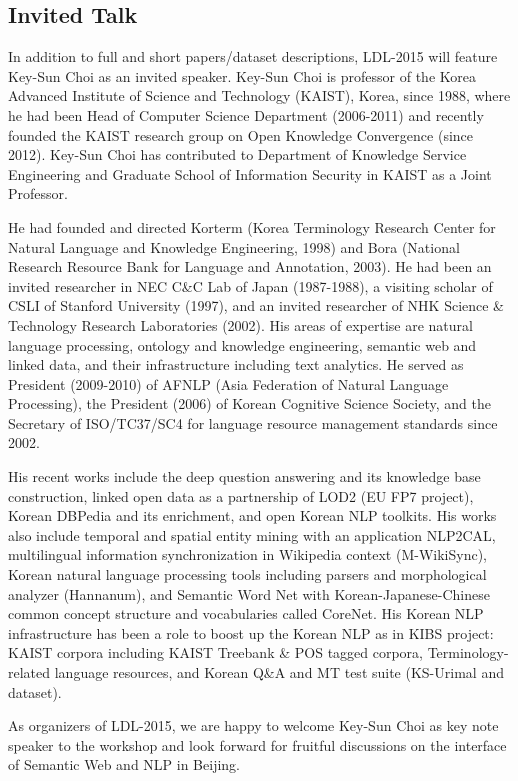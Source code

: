 \subsection{Invited Talk}

In addition to full and short papers/dataset descriptions, LDL-2015 will feature Key-Sun Choi as an invited speaker. Key-Sun Choi is professor of the Korea Advanced Institute of Science and Technology (KAIST), Korea, since 1988, where he had been Head of Computer Science Department (2006-2011) and recently founded the KAIST research group on Open Knowledge Convergence (since 2012). Key-Sun Choi has contributed to Department of Knowledge Service Engineering and Graduate School of Information Security in KAIST as a Joint Professor.

He had founded and directed Korterm (Korea Terminology Research Center for Natural Language and Knowledge Engineering, 1998) and Bora (National Research Resource Bank for Language and Annotation, 2003). He had been an invited researcher in NEC C\&C Lab of Japan (1987-1988), a visiting scholar of CSLI of Stanford University (1997), and an invited researcher of NHK Science \& Technology Research Laboratories (2002). His areas of expertise are natural language processing, ontology and knowledge engineering, semantic web and linked data, and their infrastructure including text analytics. He served as President (2009-2010) of AFNLP (Asia Federation of Natural Language Processing), the President (2006) of Korean Cognitive Science Society, and the Secretary of ISO/TC37/SC4 for language resource management standards since 2002. 

His recent works include the deep question answering and its knowledge base construction, linked open data as a partnership of LOD2 (EU FP7 project), Korean DBPedia and its enrichment, and open Korean NLP toolkits. His works also include temporal and spatial entity mining with an application NLP2CAL, multilingual information synchronization in Wikipedia context (M-WikiSync), Korean natural language processing tools including parsers and morphological analyzer (Hannanum), and Semantic Word Net with Korean-Japanese-Chinese common concept structure and vocabularies called CoreNet.  His Korean NLP infrastructure has been a role to boost up the Korean NLP as in KIBS project: KAIST corpora including KAIST Treebank \& POS tagged corpora, Terminology-related language resources, and Korean Q\&A and MT test suite (KS-Urimal and dataset). 

As organizers of LDL-2015, we are happy to welcome Key-Sun Choi as key note speaker to the workshop and look forward for fruitful discussions on the interface of Semantic Web and NLP in Beijing.

